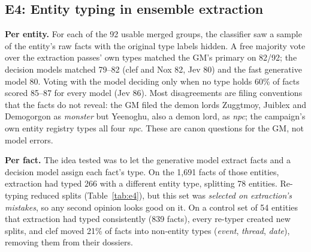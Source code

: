 \documentclass[11pt]{article}
\begin{document}
\subsection{E4: Entity typing in ensemble extraction}
\textbf{Per entity.} For each of the 92 usable merged groups, the classifier saw a sample of the
entity's raw facts with the original type labels hidden. A free majority vote over the extraction
passes' own types matched the GM's primary on 82/92; the decision models matched 79--82 (clef and
Nox 82, Jev 80) and the fast generative model 80. Voting with the model deciding only when no type
holds 60\% of facts scored 85--87 for every model (Jev 86). Most disagreements are filing conventions that the facts do not reveal:
the GM filed the demon lords Zuggtmoy, Juiblex and Demogorgon as \emph{monster} but Yeenoghu, also a
demon lord, as \emph{npc}; the campaign's own entity registry types all four \emph{npc}. These are canon questions for the GM, not model errors.

\textbf{Per fact.} The idea tested was to let the generative model extract facts and a decision model
assign each fact's type. On the 1{,}691 facts of those entities, extraction had typed 266 with a
different entity type, splitting 78 entities. Re-typing reduced splits (Table~\ref{tab:e4}), but this
set was \emph{selected on extraction's mistakes}, so any second opinion looks good on it. On a control
set of 54 entities that extraction had typed consistently (839 facts), every re-typer created new
splits, and clef moved 21\% of facts into non-entity types (\emph{event}, \emph{thread}, \emph{date}),
removing them from their dossiers.

\begin{table}[t]
\centering
\small
{}
\caption{E4, per-fact re-typing. Accuracy is on the repair set against the GM's primary type.
``Facts moved'' gives repair set + control set. Projected over the campaign's $\sim$470 consistent
dossiers, re-typing creates roughly as many splits as it repairs (clef, Jev) or more (the others).}
\label{tab:e4}
\end{table}
\end{document}
